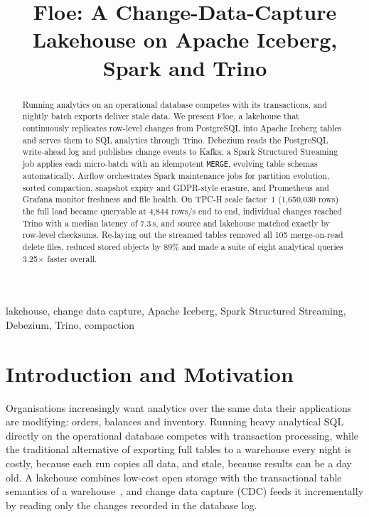 \documentclass[conference,a4paper]{IEEEtran}
\newcommand{\code}[1]{\texttt{#1}}
\begin{document}
\title{Floe: A Change-Data-Capture Lakehouse on Apache Iceberg, Spark and Trino}

\author{
}

\maketitle

\begin{abstract}
Running analytics on an operational database competes with its transactions, and nightly batch exports deliver
stale data. We present Floe, a lakehouse that continuously replicates row-level changes from PostgreSQL into
Apache Iceberg tables and serves them to SQL analytics through Trino. Debezium reads the PostgreSQL write-ahead log
and publishes change events to Kafka; a Spark Structured Streaming job applies each micro-batch with an idempotent
\code{MERGE}, evolving table schemas automatically. Airflow orchestrates Spark maintenance jobs for partition
evolution, sorted compaction, snapshot expiry and GDPR-style erasure, and Prometheus and Grafana monitor freshness
and file health. On TPC-H scale factor~1 (1,650,030 rows) the full load became queryable at 4,844 rows/s
end to end, individual changes reached Trino with a median latency of 7.3\,s, and source and lakehouse matched
exactly by row-level checksums. Re-laying out the streamed tables removed all 105 merge-on-read delete
files, reduced stored objects by 89\% and made a suite of eight analytical queries 3.25$\times$ faster
overall.
\end{abstract}

\begin{IEEEkeywords}
lakehouse, change data capture, Apache Iceberg, Spark Structured Streaming, Debezium, Trino, compaction
\end{IEEEkeywords}

\section{Introduction and Motivation}
Organisations increasingly want analytics over the same data their applications are modifying: orders, balances
and inventory. Running heavy analytical SQL directly on the operational database competes with transaction
processing, while the traditional alternative of exporting full tables to a warehouse every night is costly, because
each run copies all data, and stale, because results can be a day old. A lakehouse combines low-cost open storage
with the transactional table semantics of a warehouse~\cite{armbrust2021}, and change data capture (CDC) feeds it
incrementally by reading only the changes recorded in the database log.
\end{document}

